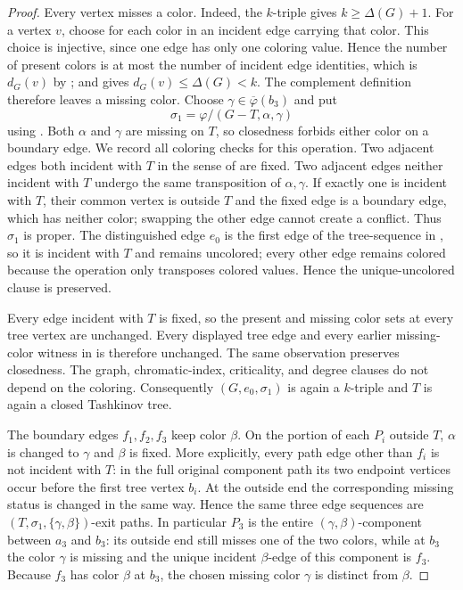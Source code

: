 \begin{proof}
Every vertex misses a color.  Indeed, the $k$-triple gives
$k\geq\Delta(G)+1$.  For a vertex $v$, choose for each color in
 an incident edge carrying that color.  This choice
is injective, since one edge has only one coloring value.  Hence the number
of present colors is at most the number of incident edge identities, which
is $d_G(v)$ by ; and  gives
$d_G(v)\leq\Delta(G)<k$.  The complement definition
 therefore leaves a missing color.  Choose
$\gamma\in\overline\varphi(b_3)$ and put
\[
 \sigma_1=\varphi/(G-T,\alpha,\gamma)
\]
using .  Both $\alpha$ and $\gamma$ are
missing on $T$, so closedness forbids either color on a boundary edge.
We record all coloring checks for this operation.  Two adjacent edges both
incident with $T$ in the sense of  are fixed.
Two adjacent edges neither incident with
$T$ undergo the same transposition of $\alpha,\gamma$.  If exactly one is
incident with $T$, their common vertex is outside $T$ and the fixed edge
is a boundary edge, which has neither color; swapping the other edge cannot
create a conflict.  Thus $\sigma_1$ is proper.  The distinguished edge
$e_0$ is the first edge of the tree-sequence in , so
it is incident with $T$ and remains uncolored; every other edge remains
colored because the operation only transposes colored values.  Hence the
unique-uncolored clause  is preserved.

Every edge incident with $T$ is fixed, so the present and missing color
sets at every tree vertex are unchanged.  Every displayed tree edge and
every earlier missing-color witness in  is therefore
unchanged.  The same observation preserves closedness.  The graph,
chromatic-index, criticality, and degree clauses do not depend on the
coloring.  Consequently $(G,e_0,\sigma_1)$ is again a $k$-triple and $T$
is again a closed Tashkinov tree.

The boundary edges $f_1,f_2,f_3$ keep color $\beta$.  On the portion of
each $P_i$ outside $T$, $\alpha$ is changed to $\gamma$ and $\beta$ is
fixed.  More explicitly, every path edge other than $f_i$ is not incident
with $T$: in the full original component path its two endpoint vertices
occur before the first tree vertex $b_i$.  At the outside end the
corresponding missing status is changed in the same way.  Hence the same
three edge sequences are
$(T,\sigma_1,\{\gamma,\beta\})$-exit paths.  In particular $P_3$ is the
entire $(\gamma,\beta)$-component between $a_3$ and $b_3$: its outside end
still misses one of the two colors, while at $b_3$ the color $\gamma$ is
missing and the unique incident $\beta$-edge of this component is $f_3$.
Because $f_3$ has color $\beta$ at $b_3$, the chosen missing color
$\gamma$ is distinct from $\beta$.


\end{proof}
